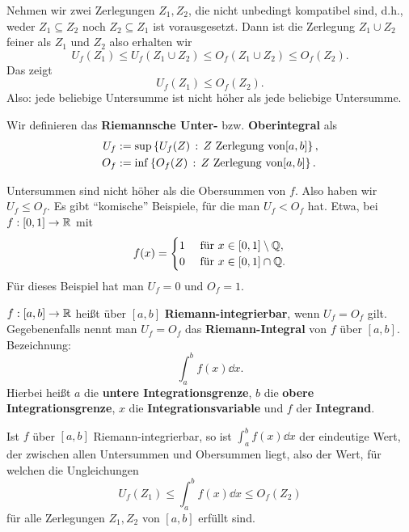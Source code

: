 \begin{bem}
	Nehmen wir zwei Zerlegungen $Z_1, Z_2$, die nicht unbedingt kompatibel sind, d.h., weder $Z_1 \subseteq Z_2$ noch $Z_2 \subseteq Z_1$ ist vorausgesetzt. Dann ist die Zerlegung $Z_1 \cup Z_2$ feiner als $Z_1$ und $Z_2$ also erhalten wir 
	\[
		U_f(Z_1) \le U_f(Z_1 \cup Z_2) \le O_f(Z_1 \cup Z_2) \le O_f(Z_2). 
	\]
	Das zeigt
	\[
		U_f(Z_1) \le O_f(Z_2). 
	\]
	Also: jede beliebige Untersumme ist nicht höher als jede beliebige Untersumme. 
\end{bem} 

\begin{defn} 
	Wir definieren das \textbf{Riemannsche Unter-} bzw. \textbf{Oberintegral} als 
	\begin{align*}
		U_f & := \sup \left\{  U_f(Z)  \,:\, Z \ \text{Zerlegung von} [a,b] \right\},
\\		O_f & := \inf \left\{  O_f(Z) \,:\, Z \ \text{Zerlegung von} [a,b] \right\}. 
	\end{align*} 
\end{defn} 

\begin{bem}
	Untersummen sind nicht höher als die Obersummen von $f$. Also haben wir 
	$U_f \le O_f$. Es gibt ``komische'' Beispiele, für die man $U_f < O_f$ hat. Etwa, bei $f : [0,1] \to \mathbb{R}$ mit 
	\[
		f(x) = \begin{cases}
			1 & \ \text{für} \ x \in [0,1] \setminus \mathbb{Q},
			\\ 0 & \  \text{für}  \ x \in [0,1] \cap \mathbb{Q}.
		\end{cases}
	\]
	Für dieses Beispiel hat man $U_f = 0$ und $O_f = 1$. 
\end{bem} 

\begin{defn}
	$f :[a,b] \to \mathbb{R}$ heißt über $[a,b]$ \textbf{Riemann-integrierbar}, wenn $U_f = O_f$ gilt. Gegebenenfalls nennt man $U_f = O_f$ das \textbf{Riemann-Integral} von $f$ über $[a,b]$. Bezeichnung: 
	\[
		\int_a^b f(x) \dd x.
	\]
Hierbei heißt $a$ die \textbf{untere Integrationsgrenze}, $b$ die \textbf{obere Integrationsgrenze}, $x$ die \textbf{Integrationsvariable} und $f$ der \textbf{Integrand}. 
\end{defn} 

\begin{bem} 
	Ist $f$ über $[a,b]$ Riemann-integrierbar, so ist $\int_a^b f(x) \dd x$ der eindeutige Wert, der zwischen allen Untersummen und Obersummen liegt, also der Wert, für welchen die Ungleichungen 
	\[
		U_f(Z_1) \le \int_a^b f(x) \dd x \le O_f(Z_2)
	\]
	für alle Zerlegungen $Z_1, Z_2$ von $[a,b]$ erfüllt sind. 	
\end{bem} 


